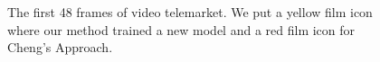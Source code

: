 \begin{figure}[t]
  \center {}
  \hspace{4mm} 
\caption{The first 48 frames of video
  telemarket. We put a yellow film icon where our method trained a new
  model and a red film icon for Cheng's Approach.}
\label{fig:telemarket}
\end{figure}


